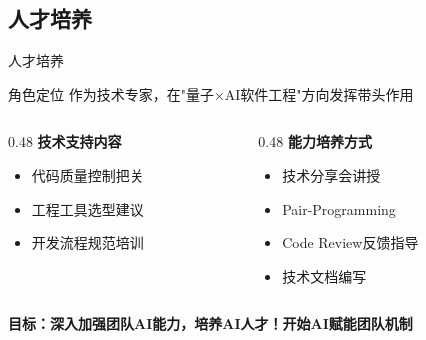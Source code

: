 \documentclass[aspectratio=169,11pt]{beamer}
\begin{document}
\subsection{人才培养}
\begin{frame}{人才培养}
    \begin{block}{角色定位}
        作为技术专家，在"量子×AI软件工程"方向发挥带头作用
    \end{block}
    
    \vspace{0.3cm}
    
    \begin{columns}[T]
        \begin{column}{0.48\textwidth}
            \textbf{技术支持内容}
            \begin{itemize}
                \item 代码质量控制把关
                \item 工程工具选型建议
                \item 开发流程规范培训
            \end{itemize}
        \end{column}
        \begin{column}{0.48\textwidth}
            \textbf{能力培养方式}
            \begin{itemize}
                \item 技术分享会讲授
                \item Pair-Programming
                \item Code Review反馈指导
                \item 技术文档编写
            \end{itemize}
        \end{column}
    \end{columns}
    
    \vspace{0.3cm}
    
    \begin{center}
        \colorbox{cmccblue!15}{
            \textbf{目标：深入加强团队AI能力，培养AI人才！开始AI赋能团队机制}
        }
    \end{center}
\end{frame}

\end{document}
